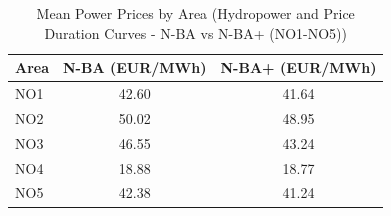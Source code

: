 \begin{table}[htbp]
\centering
\caption{Mean Power Prices by Area (Hydropower and Price Duration Curves - N-BA vs N-BA+ (NO1-NO5))}
\label{tab:mean_prices_NO_areas_N_BA_vs_N_BA_plus}
\begin{tabular}{lcc}
\hline
Area & N-BA (EUR/MWh) & N-BA+ (EUR/MWh) \\
\hline
NO1 & 42.60 & 41.64 \\
NO2 & 50.02 & 48.95 \\
NO3 & 46.55 & 43.24 \\
NO4 & 18.88 & 18.77 \\
NO5 & 42.38 & 41.24 \\
\hline
\end{tabular}
\end{table}